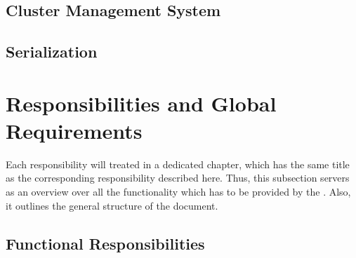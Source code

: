\documentclass[a4paper, 12pt]{book}
\begin{document}

\subsection{Cluster Management System}


\subsection{Serialization}
\label{sec:introduction:used-interfaces:serialization}


\section{Responsibilities and Global Requirements}

Each responsibility will treated in a dedicated chapter, which has the same
title as the corresponding responsibility described here. Thus, this
subsection servers as an overview over all the functionality which has to be
provided by the \SYNEIGHT. Also, it outlines the general structure of
the document. 

\subsection{Functional Responsibilities}



\newcommand{\respentitystaterepresentation}{ The \SYNEIGHT is
  responsible for providing a sufficiently general representation for the
  state of \dt{entities}. This representation must be abstract from the
  \SYNEIGHT's perspective but provide general methods to integrate
  specific state interpretations into the \SYNEIGHT which might differ
  from \dt{entity} to \dt{entity}, i.e., different types of \dt{entities} must
  be supported. In contrast, the \dt{client's} view of the \dt{entities}
  should be type-safe. The \SYNEIGHT's representation framework should
  allow to employ a wide range of different representation and implementation
  strategies as well as dynamic configuration of these implementations.}
\end{document}

